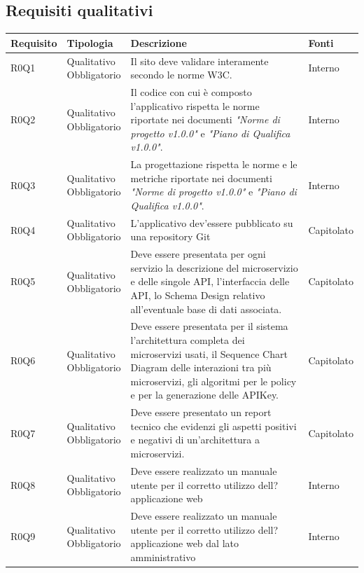 \documentclass[12pt,a4paper,titlepage]{article}
\newcommand{\minitab}[2][1]{\begin{tabular}#1 #2\end{tabular}}
\begin{document}
	\subsection{Requisiti qualitativi}
	{\renewcommand\arraystretch{1.2}  %
		\small
		\begin{longtable}{|m{5em}|m{6em}|m{28em}|m{5em}|}
			\hline
			\textbf{Requisito} & \textbf{Tipologia}  & \textbf{Descrizione} & \textbf{Fonti} \\
			\hline
			R0Q1 & \minitab[c]{Qualitativo\\Obbligatorio} & Il sito deve validare interamente secondo le norme W3C. & Interno\\
			\hline
			R0Q2 & \minitab[c]{Qualitativo\\Obbligatorio} & Il codice con cui è composto l'applicativo rispetta le norme riportate nei documenti \textit{"Norme di progetto v1.0.0"} e \textit{"Piano di Qualifica v1.0.0"}. & Interno\\
			\hline
			R0Q3 & \minitab[c]{Qualitativo\\Obbligatorio} & La progettazione rispetta le norme e le metriche riportate nei documenti \textit{"Norme di progetto v1.0.0"} e \textit{"Piano di Qualifica v1.0.0"}. & Interno\\
			\hline
			R0Q4 & \minitab[c]{Qualitativo\\Obbligatorio} & L'applicativo dev'essere pubblicato su una repository Git & Capitolato\\
			\hline
			R0Q5 & \minitab[c]{Qualitativo\\Obbligatorio} & Deve essere presentata per ogni servizio la descrizione del microservizio e delle singole API, l'interfaccia delle API, lo Schema Design relativo all'eventuale base di dati associata. & Capitolato\\
			\hline
			R0Q6 & \minitab[c]{Qualitativo\\Obbligatorio} & Deve essere presentata per il sistema l'architettura completa dei microservizi usati, il Sequence Chart Diagram delle interazioni tra più microservizi, gli algoritmi per le policy e per la generazione delle APIKey. & Capitolato\\
			\hline
			R0Q7 & \minitab[c]{Qualitativo\\Obbligatorio} & Deve essere presentato un report tecnico che evidenzi gli aspetti positivi e negativi di un'architettura a microservizi. & Capitolato\\
			\hline
			R0Q8 & \minitab[c]{Qualitativo\\Obbligatorio} & Deve essere realizzato un manuale utente per il corretto utilizzo dell?applicazione web & Interno\\
			\hline
			R0Q9 & \minitab[c]{Qualitativo\\Obbligatorio} & Deve essere realizzato un manuale utente per il corretto utilizzo dell?applicazione web dal lato amministrativo & Interno\\
			\hline
		\end{longtable}
	}
	\newpage
\end{document}
